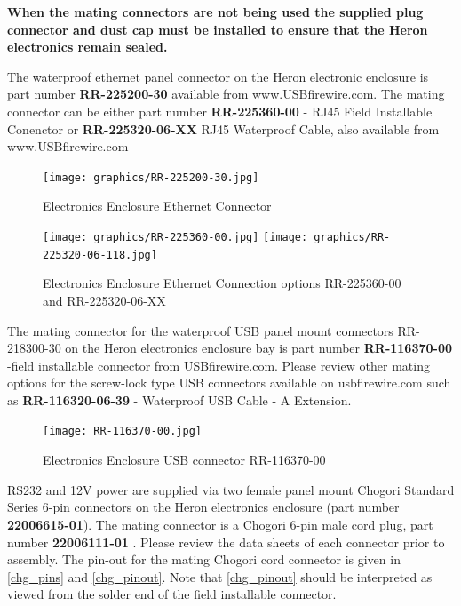 \documentclass[]{clearpath-latex/clearpath-manual}
\begin{document}
\textbf{When the mating connectors are not being used the supplied plug connector and dust cap must be installed to ensure that the Heron electronics remain sealed.}

The waterproof ethernet panel connector on the Heron electronic enclosure is part number \textbf{RR-225200-30} available from www.USBfirewire.com. The mating connector can be either part number \textbf{RR-225360-00} - RJ45 Field Installable Conenctor or \textbf{RR-225320-06-XX} RJ45 Waterproof Cable, also available from www.USBfirewire.com



\begin{figure}[h]
  \centering
  \texttt{[image: graphics/RR-225200-30.jpg]}
  \label{h_eth0}
  \caption{Electronics Enclosure Ethernet Connector}
\end{figure}

\begin{figure}[h]
  \centering
  \texttt{[image: graphics/RR-225360-00.jpg]}
  \texttt{[image: graphics/RR-225320-06-118.jpg]}

  \label{h_eth1}
  \caption{Electronics Enclosure Ethernet Connection options RR-225360-00 and RR-225320-06-XX}
\end{figure}

The mating connector for the waterproof USB panel mount connectors RR-218300-30 on the Heron electronics enclosure bay is part number \textbf{RR-116370-00} -field installable connector from USBfirewire.com. Please review other mating options for the screw-lock type USB connectors available on usbfirewire.com such as \textbf{RR-116320-06-39} - Waterproof USB Cable - A Extension.

\begin{figure}[h]
  \centering
  \texttt{[image: RR-116370-00.jpg]}
  \label{h_usb0}
  \caption{Electronics Enclosure USB connector RR-116370-00}
\end{figure}

RS232 and 12V power are supplied via two female panel mount Chogori Standard Series 6-pin connectors on the Heron electronics enclosure (part number \textbf{22006615-01}).  The mating connector is a Chogori 6-pin male cord plug, part number \textbf{22006111-01} . Please review the data sheets of each connector prior to assembly. The pin-out for the mating Chogori cord connector is given in \autoref{chg_pins} and \autoref{chg_pinout}. Note that \autoref{chg_pinout} should be interpreted as viewed from the solder end of the field installable connector.
\end{document}
